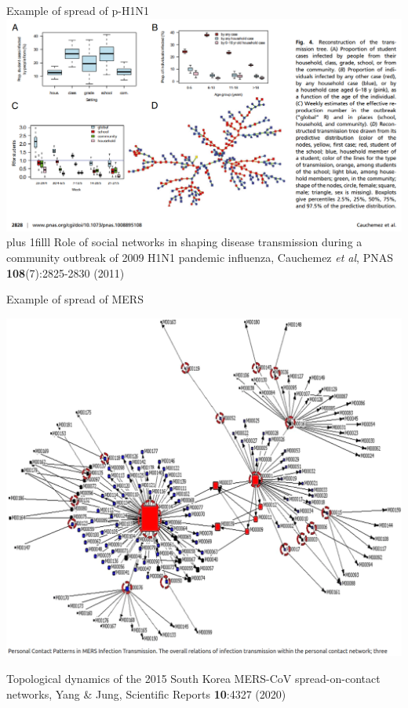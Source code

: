 \documentclass[aspectratio=43]{beamer}
\begin{document}
\begin{frame}{Example of spread of p-H1N1}
	\bigskip
	{\centering
		\hspace*{-\beamerleftmargin}
		\includegraphics[width=\paperwidth]{FIGS/Cauchemez_etal_H1N1}
	}
	\vskip0pt plus 1filll
	\tiny
	Role of social networks in shaping disease transmission during a community outbreak of 2009 H1N1 pandemic influenza, Cauchemez \emph{et al}, PNAS \textbf{108}(7):2825-2830 (2011)
\end{frame}

\begin{frame}{Example of spread of MERS}
	\begin{minipage}{0.8\textwidth}
		\hspace*{-\beamerleftmargin}
		\includegraphics[height=\paperheight]{FIGS/YangJung2015SouthKoreaMERS}
	\end{minipage}
	\begin{minipage}{0.18\textwidth}
	\tiny
	Topological dynamics of the 2015 South Korea MERS-CoV spread-on-contact networks, Yang \& Jung, Scientific Reports \textbf{10}:4327 (2020)
	\end{minipage}
\end{frame}
\end{document}
